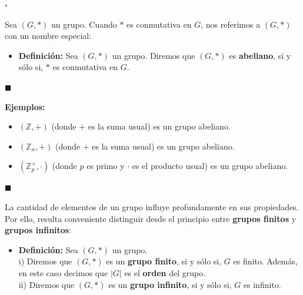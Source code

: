 \documentclass[10 pt]{article}
\begin{document}
\begin{flushright}
    $\square$
\end{flushright}

\Large{Sea $(G,*)$ un grupo. Cuando $*$ es conmutativa en $G$, nos referimos a $(G,*)$ con un nombre especial:} \\

\begin{itemize}
    \item \Large{\textbf{Definición:} Sea $(G,*)$ un grupo. Diremos que $(G,*)$ es \textbf{abeliano}, si y sólo si, $*$ es conmutativa en $G$.} \\
\end{itemize}

\begin{flushright}
    $\blacksquare$
\end{flushright}

\Large{\textbf{Ejemplos:}} \\

\begin{itemize}
    \item \Large{$(\mathbb Z,+)$ (donde $+$ es la suma usual) es un grupo abeliano.} \\
    
    \item{\Large{$(\mathbb Z_n,+)$ (donde $+$ es la suma usual) es un grupo abeliano.}} \\
    
    \item \Large{$(\mathbb Z_p^{\times},\cdot)$ (donde $p$ es primo y $\cdot$ es el producto usual) es un grupo abeliano.} \\
\end{itemize}

\begin{flushright}
$\blacksquare$
\end{flushright}

\Large{La cantidad de elementos de un grupo influye profundamente en sus propiedades. Por ello, resulta conveniente distinguir desde el principio entre \textbf{grupos finitos} y \textbf{grupos infinitos}:} \\

\begin{itemize}
    \item \Large{\textbf{Definición:} Sea $(G,*)$ un grupo. \\

    i) Diremos que $(G,*)$ es un \textbf{grupo finito}, si y sólo si, $G$ es finito. Además, en este caso decimos que $|G|$ es el \textbf{orden} del grupo. \\

    ii) Diremos que $(G,*)$ es un \textbf{grupo infinito}, si y sólo si, $G$ es infinito.} \\ 
\end{itemize}
\end{document}
